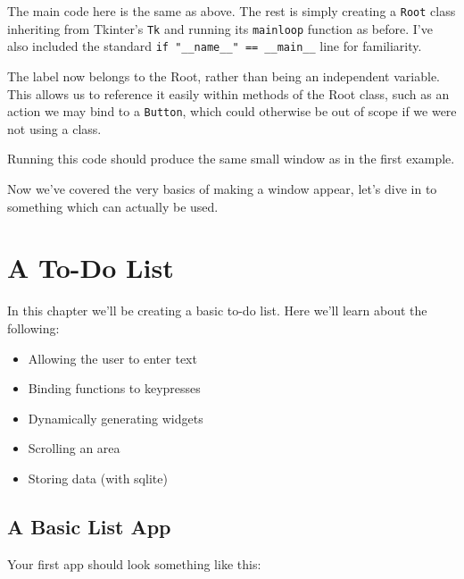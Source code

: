 \documentclass[a4paper,11pt,openany]{book}
\begin{document}


The main code here is the same as above. The rest is simply creating a \lstinline[columns=fixed]{Root} class inheriting from Tkinter's \lstinline[columns=fixed]{Tk} and running its \lstinline[columns=fixed]{mainloop} function as before. I've also included the standard \break 
\lstinline[columns=fixed]{if "__name__" == __main__} line for familiarity.

\vspace{5mm}

The label now belongs to the Root, rather than being an independent variable. This allows us to reference it easily within methods of the Root class, such as an action we may bind to a \lstinline[columns=fixed]{Button}, which could otherwise be out of scope if we were not using a class.

\vspace{5mm}

Running this code should produce the same small window as in the first example.

\vspace{5mm}

Now we've covered the very basics of making a window appear, let's dive in to something which can actually be used.

\chapter{A To-Do List}
In this chapter we'll be creating a basic to-do list. Here we'll learn about the following:

\begin{itemize}
  \item Allowing the user to enter text
  \item Binding functions to keypresses
  \item Dynamically generating widgets 
  \item Scrolling an area
  \item Storing data (with sqlite)
\end{itemize} 

\section{A Basic List App}

Your first app should look something like this:
\end{document}
